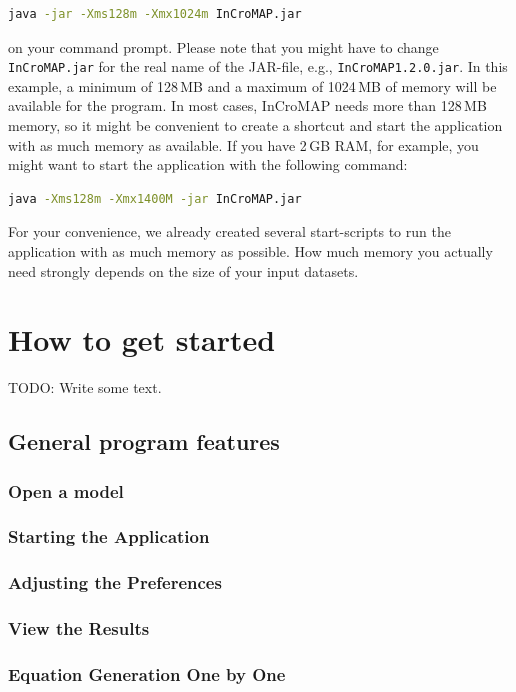 \begin{lstlisting}[language=bash,numbers=none]
java -jar -Xms128m -Xmx1024m InCroMAP.jar
\end{lstlisting}

\noindent on your command prompt. Please note that you might have to change
\texttt{InCroMAP.jar} for the real name of the JAR-file, e.g.,
\texttt{InCroMAP1.2.0.jar}. In this example, a minimum of 128\,MB and a maximum
of 1024\,MB of memory will be available for the program. In most cases,
InCroMAP needs more than 128\,MB memory, so it might be convenient to create a
shortcut and start the application with as much memory as available. If you
have 2\,GB RAM, for example, you might want to start the application with the
following command:

\begin{lstlisting}[language=bash,numbers=none]
java -Xms128m -Xmx1400M -jar InCroMAP.jar
\end{lstlisting}

For your convenience, we already created several start-scripts to run the
application with as much memory as possible. How much memory you actually need
strongly depends on the size of your input datasets.
%

\chapter{How to get started}

TODO: Write some text.

\section{General program features}
\subsection{Open a model}
\subsection{Starting the Application}
\subsection{Adjusting the Preferences}
\subsection{View the Results}
\subsection{Equation Generation One by One}


